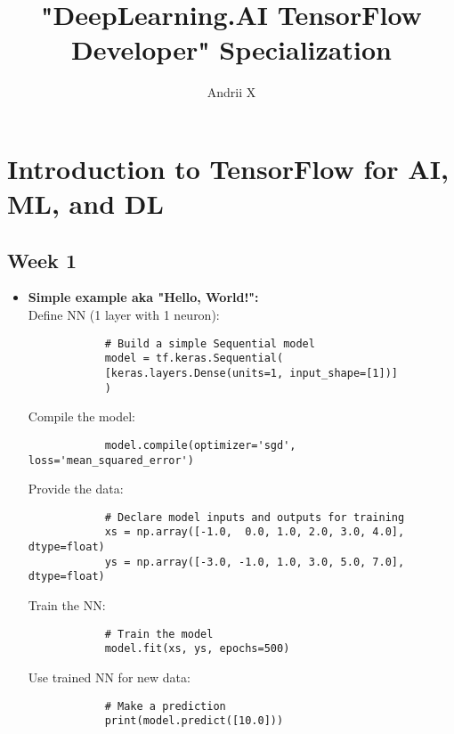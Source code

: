 \documentclass[16pt]{article}
\title{"DeepLearning.AI TensorFlow Developer" Specialization }
\author{ Andrii X }
\date{}
\begin{document}
	\maketitle
	
	\section{Introduction to TensorFlow for AI, ML, and DL}
	\subsection{Week 1}
	\begin{itemize}
		
		\item \textbf{Simple example aka "Hello, World!":}
		\\
		Define NN (1 layer with 1 neuron):
		\begin{verbatim}
			# Build a simple Sequential model
			model = tf.keras.Sequential(
			[keras.layers.Dense(units=1, input_shape=[1])]
			)
		\end{verbatim}
		Compile the model:
		\begin{verbatim}
			model.compile(optimizer='sgd', loss='mean_squared_error')
		\end{verbatim}
		Provide the data:
		\begin{verbatim}
			# Declare model inputs and outputs for training
			xs = np.array([-1.0,  0.0, 1.0, 2.0, 3.0, 4.0], dtype=float)
			ys = np.array([-3.0, -1.0, 1.0, 3.0, 5.0, 7.0], dtype=float)	
		\end{verbatim}
		Train the NN:
		\begin{verbatim}
			# Train the model
			model.fit(xs, ys, epochs=500)	
		\end{verbatim}
		Use trained NN for new data:
		\begin{verbatim}
			# Make a prediction
			print(model.predict([10.0]))	
		\end{verbatim}
	\end{itemize}
\end{document}
